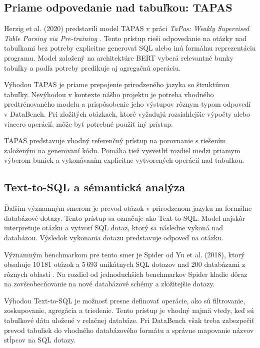 \subsection{Priame odpovedanie nad tabuľkou: TAPAS}

Herzig et al. (2020) predstavili model TAPAS v práci \emph{TaPas: Weakly Supervised Table Parsing via Pre-training} \cite{tapas}. Tento prístup rieši odpovedanie na otázky nad tabuľkami bez potreby explicitne generovať SQL alebo inú formálnu reprezentáciu programu. Model založený na architektúre BERT vyberá relevantné bunky tabuľky a podľa potreby predikuje aj agregačnú operáciu.

Výhodou TAPAS je priame prepojenie prirodzeného jazyka so štruktúrou tabuľky. Nevýhodou v kontexte nášho projektu je potreba vhodného predtrénovaného modelu a prispôsobenie jeho výstupov rôznym typom odpovedí v DataBench. Pri zložitých otázkach, ktoré vyžadujú rozsiahlejšie výpočty alebo viacero operácií, môže byť potrebné použiť iný prístup.

TAPAS predstavuje vhodný referenčný prístup na porovnanie s riešením založeným na generovaní kódu. Pomáha tiež vysvetliť rozdiel medzi priamym výberom buniek a vykonávaním explicitne vytvorených operácií nad tabuľkou.

\subsection{Text-to-SQL a sémantická analýza}

Ďalším významným smerom je prevod otázok v prirodzenom jazyku na formálne databázové dotazy. Tento prístup sa označuje ako Text-to-SQL. Model najskôr interpretuje otázku a vytvorí SQL dotaz, ktorý sa následne vykoná nad databázou. Výsledok vykonania dotazu predstavuje odpoveď na otázku.

Významným benchmarkom pre tento smer je Spider od Yu et al. (2018), ktorý obsahuje 10\,181 otázok a 5\,693 unikátnych SQL dotazov nad 200 databázami z rôznych oblastí \cite{spider}. Na rozdiel od jednoduchších benchmarkov Spider kladie dôraz na zovšeobecňovanie na nové databázové schémy a zložitejšie dotazy.

Výhodou Text-to-SQL je možnosť presne definovať operácie, ako sú filtrovanie, zoskupovanie, agregácia a triedenie. Tento prístup je vhodný najmä vtedy, keď sú tabuľkové dáta uložené v relačnej databáze. Pri DataBench však treba zabezpečiť prevod tabuliek do vhodného databázového formátu a správne mapovanie názvov stĺpcov na SQL dotazy.


